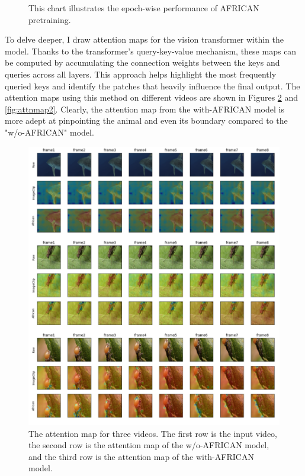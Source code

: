 \begin{figure}[ht]
    \centering
    \resizebox{1.0\textwidth}{!}{}
    \caption[Accuracy on each epoch for AFRICAN Pretraining]{This chart illustrates the epoch-wise performance of AFRICAN pretraining.}
    \label{fig:tp_africanpretraining}
\end{figure}

To delve deeper, I draw attention maps for the vision transformer within the model. Thanks to the transformer's query-key-value mechanism, these maps can be computed by accumulating the connection weights between the keys and queries across all layers. This approach helps highlight the most frequently queried keys and identify the patches that heavily influence the final output. The attention maps using this method on different videos are shown in Figures \ref{fig:attnmap1} and \ref{fig:attnmap2}. Clearly, the attention map from the with-AFRICAN model is more adept at pinpointing the animal and even its boundary compared to the "w/o-AFRICAN" model.

\begin{figure}[ht]
    \centering
    \includegraphics[width=1.0\textwidth]{assets/imgs/5_4_AttentionMaps_1}
    \caption[Attention Map 1]{The attention map for three videos. The first row is the input video, the second row is the attention map of the w/o-AFRICAN model, and the third row is the attention map of the with-AFRICAN model.}
    \label{fig:attnmap1}
\end{figure}

